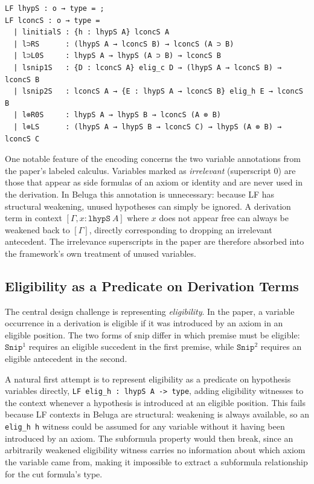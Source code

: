 \begin{lstlisting}
LF lhypS : o → type = ;
LF lconcS : o → type =
  | linitialS : {h : lhypS A} lconcS A
  | l⊃RS      : (lhypS A → lconcS B) → lconcS (A ⊃ B)
  | l⊃L0S     : lhypS A → lhypS (A ⊃ B) → lconcS B
  | lsnip1S   : {D : lconcS A} elig_c D → (lhypS A → lconcS B) → lconcS B
  | lsnip2S   : lconcS A → {E : lhypS A → lconcS B} elig_h E → lconcS B
  | l⊗R0S     : lhypS A → lhypS B → lconcS (A ⊗ B)
  | l⊗LS      : (lhypS A → lhypS B → lconcS C) → lhypS (A ⊗ B) → lconcS C
\end{lstlisting}

One notable feature of the encoding concerns the two variable annotations
from the paper's labeled calculus. Variables marked as \emph{irrelevant}
(superscript $0$) are those that appear as side formulas of an axiom or
identity and are never used in the derivation. In Beluga this annotation
is unnecessary: because LF has structural weakening, unused hypotheses
can simply be ignored. A derivation term in context $[\Gamma, x :
\texttt{lhypS}~A]$ where $x$ does not appear free can always be weakened
back to $[\Gamma]$, directly corresponding to dropping an irrelevant
antecedent. The irrelevance superscripts in the paper are therefore
absorbed into the framework's own treatment of unused variables.

\subsection{Eligibility as a Predicate on Derivation Terms}

The central design challenge is representing \emph{eligibility}. In the
paper, a variable occurrence in a derivation is eligible if it was
introduced by an axiom in an eligible position. The two forms of snip
differ in which premise must be eligible: $\texttt{Snip}^1$ requires an
eligible succedent in the first premise, while $\texttt{Snip}^2$ requires
an eligible antecedent in the second.

A natural first attempt is to represent eligibility as a predicate on
hypothesis variables directly, \texttt{LF elig\_h : lhypS A -> type},
adding eligibility witnesses to the context whenever a hypothesis is
introduced at an eligible position. This fails because LF contexts in
Beluga are structural: weakening is always available, so an
\texttt{elig\_h h} witness could be assumed for any variable without it
having been introduced by an axiom. The subformula property would then
break, since an arbitrarily weakened eligibility witness carries no
information about which axiom the variable came from, making it
impossible to extract a subformula relationship for the cut formula's
type.

